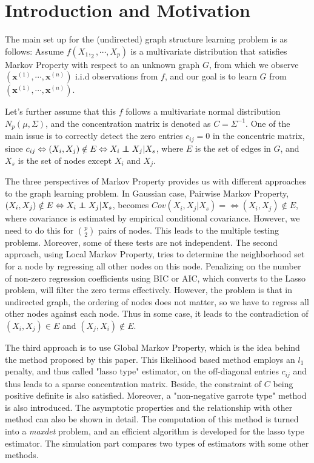 
\color{SaddleBrown} %

\section*{Introduction and Motivation}

The main set up for the (undirected) graph structure learning problem is as follows: Assume $f(X_1, _2, \cdots, X_p)$ is a multivariate distribution that satisfies Markov Property with respect to an unknown graph $G$, from which we observe $(\mathbf{x}^{(1)}, \cdots, \mathbf{x}^{(n)})$ i.i.d observations from $f$, and our goal is to learn $G$ from $(\mathbf{x}^{(1)}, \cdots, \mathbf{x}^{(n)})$. 

Let's further assume that this $f$ follows a multivariate normal distribution $N_p(\mu, \Sigma)$, and the concentration matrix is denoted as $C = \Sigma^{-1}$. One of the main issue is to correctly detect the zero entries $c_{ij} = 0$ in the concentric matrix, since $c_{ij} \Leftrightarrow (X_i, X_j) \notin E \Leftrightarrow X_i \independent X_j | X_s$, where $E$ is the set of edges in $G$, and $X_s$ is the set of nodes except $X_i$ and $X_j$. 

The three perspectives of Markov Property provides us with different approaches to the graph learning problem. In Gaussian case, Pairwise Markov Property, $(X_i, X_j) \notin E \Leftrightarrow X_i \independent X_j | X_s$, becomes $Cov(X_i, X_j | X_s) = \Leftrightarrow (X_i, X_j) \notin E$, where covariance is estimated by empirical conditional covariance. However, we need to do this for ${p \choose 2}$ pairs of nodes. This leads to the multiple testing problems. Moreover, some of these tests are not independent. The second approach, using Local Markov Property, tries to determine the neighborhood set for a node by regressing all other nodes on this node. Penalizing on the number of non-zero regression coefficients using BIC or AIC, which converts to the Lasso problem, will filter the zero terms effectively. However, the problem is that in undirected graph, the ordering of nodes does not matter, so we have to regress all other nodes against each node. Thus in some case, it leads to the contradiction of $(X_i, X_j) \in E$ and $(X_j, X_i) \notin E$.

The third approach is to use Global Markov Property, which is the idea behind the method proposed by this paper. This likelihood based method employs an $l_1$ penalty, and thus called "lasso type" estimator, on the off-diagonal entries $c_{ij}$ and thus leads to a sparse concentration matrix. Beside, the constraint of $C$ being positive definite is also satisfied. Moreover, a "non-negative garrote type" method is also introduced. The asymptotic properties and the relationship with other method can also be shown in detail. The computation of this method is turned into a \emph{maxdet} problem, and an efficient algorithm is developed for the lasso type estimator. The simulation part compares two types of estimators with some other methods. 